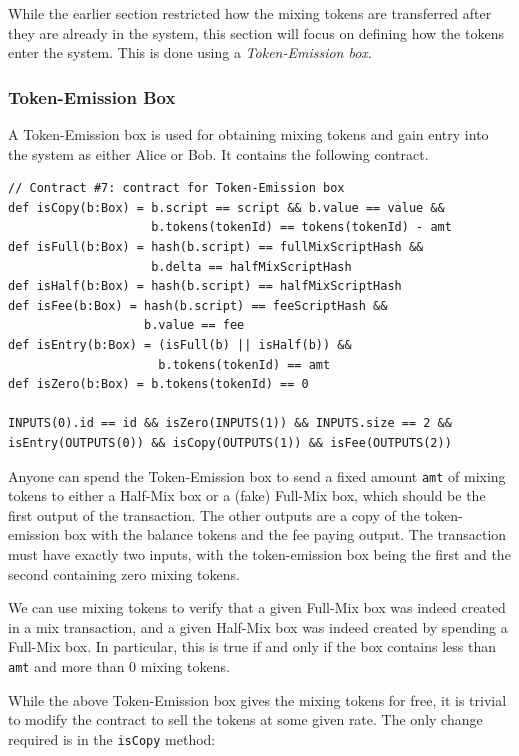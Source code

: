 \documentclass[runningheads]{llncs}
\begin{document}
While the earlier section restricted how the mixing tokens are transferred after they are already in the system, this section will focus on defining how the tokens enter the system. This is done using a {\em Token-Emission box}. 

\subsubsection{Token-Emission Box}

A Token-Emission box is used for obtaining mixing tokens and gain entry into the system as either Alice or Bob. It contains the following contract. 

{\small
\begin{Verbatim}[frame=single]
// Contract #7: contract for Token-Emission box
def isCopy(b:Box) = b.script == script && b.value == value &&
                    b.tokens(tokenId) == tokens(tokenId) - amt
def isFull(b:Box) = hash(b.script) == fullMixScriptHash && 
                    b.delta == halfMixScriptHash
def isHalf(b:Box) = hash(b.script) == halfMixScriptHash
def isFee(b:Box) = hash(b.script) == feeScriptHash &&
                   b.value == fee
def isEntry(b:Box) = (isFull(b) || isHalf(b)) && 
                     b.tokens(tokenId) == amt
def isZero(b:Box) = b.tokens(tokenId) == 0

INPUTS(0).id == id && isZero(INPUTS(1)) && INPUTS.size == 2 &&
isEntry(OUTPUTS(0)) && isCopy(OUTPUTS(1)) && isFee(OUTPUTS(2))
\end{Verbatim}
}

Anyone can spend the Token-Emission box to send a fixed amount \texttt{amt} of mixing tokens to either a Half-Mix box or a (fake) Full-Mix box, which should be the first output of the transaction. The other outputs are a copy of the token-emission box with the balance tokens and the fee paying output. The transaction must have exactly two inputs, with the token-emission box being the first and the second containing zero mixing tokens. 

We can use mixing tokens to verify that a given Full-Mix box was indeed created in a mix transaction, and a given Half-Mix box was indeed created by spending a Full-Mix box. In particular, this is true if and only if the box contains less than \texttt{amt} and more than 0 mixing tokens.  

While the above Token-Emission box gives the mixing tokens for free, it is trivial to modify the contract to sell the tokens at some given rate. The only change required is in the \texttt{isCopy} method:
\end{document}
